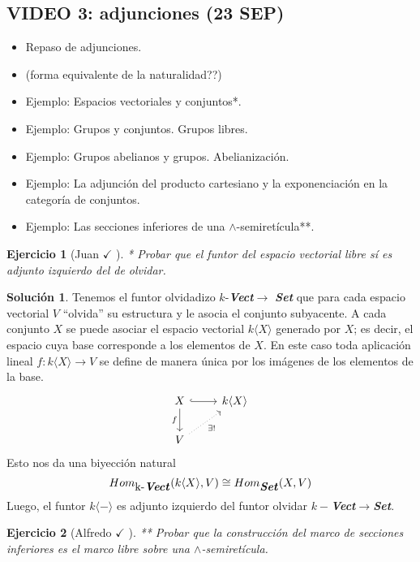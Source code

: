 \documentclass[12pt,letterpaper,titlepage]{article}
\newtheorem{exe}{Ejercicio}
\theoremstyle{definition}
\newtheorem*{sol}{Solución}
\renewcommand\inf{\wedge}
\newcommand\<{\langle}
\renewcommand\>{\rangle}
\begin{document}
\subsection{VIDEO 3: adjunciones (23 SEP)}
\begin{itemize}
  \item Repaso de adjunciones.
  \item (forma equivalente de la naturalidad??)
  \item Ejemplo: Espacios vectoriales y conjuntos*.
  \item Ejemplo: Grupos y conjuntos. Grupos libres.
  \item Ejemplo: Grupos abelianos y grupos. Abelianización.
  \item Ejemplo: La adjunción del producto cartesiano y la
    exponenciación en la categoría de conjuntos.
  \item Ejemplo: Las secciones inferiores de una
  $\inf$-semiretícula**.
\end{itemize}
\begin{exe}[Juan $\checkmark$ ]
  * Probar que el funtor del espacio vectorial libre sí es
  adjunto izquierdo del de olvidar.
\end{exe}
\begin{sol}
    Tenemos el funtor olvidadizo $k$-\textbf{\textit{Vect}}$\to$ \textbf{\textit{Set}} que para cada espacio vectorial $V$ “olvida” su estructura y le asocia el conjunto subyacente. A cada conjunto $X$ se puede asociar el espacio vectorial $k\langle X\rangle$ generado por $X$; es decir, el espacio cuya base corresponde a los elementos de $X$. En este caso toda aplicación lineal $f:k\langle X\rangle\to V$ se define de manera única por los imágenes de los elementos de la base.
    \[\begin{tikzcd}
	{X} & {k\langle X\rangle} \\
	{V}
	\arrow["{f}"', from=1-1, to=2-1]
	\arrow[from=1-1, to=1-2, hook]
	\arrow["{\exists !}"', from=2-1, to=1-2, dotted]
\end{tikzcd}\]
Esto nos da una biyección natural $$Hom_{\mbox{k-\textbf{\textit{Vect}}}}(k\langle X\rangle, V)\cong Hom_{\mbox{\textbf{\textit{Set}}}}(X,V)$$
Luego, el funtor $k\langle -\rangle$ es adjunto izquierdo del funtor olvidar $k-$\textbf{\textit{Vect}}$\to$\textbf{\textit{Set}}.
\end{sol}
\begin{exe}[Alfredo $\checkmark$ ]
  ** Probar que la construcción del marco de secciones
  inferiores es el marco libre sobre una $\inf$-semiretícula.
\end{exe}
\end{document}
